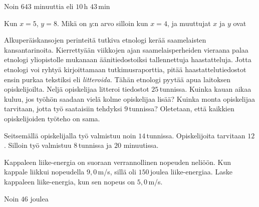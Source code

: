 \begin{tehtavasivu}
\begin{tehtava}
    \begin{vastaus}
        Noin $643$ minuuttia eli $10$\,h $43$\,min
    \end{vastaus}
\end{tehtava}

\begin{tehtava}
	Kun $x = 5$, $y = 8$. Mikä on $y$:n arvo silloin kun $x = 4$, ja muuttujat $x$ ja $y$ ovat
	\begin{alakohdatrivi}
	\end{alakohdatrivi}
	\begin{vastaus}
		\begin{alakohdat}
		\end{alakohdat}
	\end{vastaus}
\end{tehtava}

\begin{tehtava}
Alkuperäiskansojen perinteitä tutkiva etnologi kerää saamelaisten kansantarinoita. Kierrettyään viikkojen ajan saamelaisperheiden vieraana palaa etnologi yliopistolle mukanaan äänitiedostoiksi tallennettuja haastatteluja. Jotta etnologi voi ryhtyä kirjoittamaan tutkimusraporttia, pitää haastattelutiedostot ensin purkaa tekstiksi eli \emph{litteroida.} Tähän etnologi pyytää apua laitoksen opiskelijoilta. Neljä opiskelijaa litteroi tiedostot $25$\,tunnissa. Kuinka kauan aikaa kuluu, jos työhön saadaan vielä kolme opiskelijaa lisää? Kuinka monta opiskelijaa tarvitaan, jotta työ saataisiin tehdyksi $9$\,tunnissa? Oletetaan, että kaikkien opiskelijoiden työteho on sama.

\begin{vastaus}
Seitsemällä opiskelijalla työ valmistuu noin $14$\,tunnissa. Opiskelijoita tarvitaan $12$. Silloin työ valmistuu $8$\,tunnissa ja $20$ minuutissa. 
\end{vastaus}
\end{tehtava}

\begin{tehtava}
	Kappaleen liike-energia on suoraan verrannollinen nopeuden neliöön.
	Kun kappale liikkui nopeudella $9,0$\,m/s, sillä oli $150$\,joulea liike-energiaa.
	Laske kappaleen liike-energia, kun sen nopeus on $5,0$\,m/s. 
	\begin{vastaus}
		Noin $46$ joulea
	\end{vastaus}
\end{tehtava}


\end{tehtavasivu}
